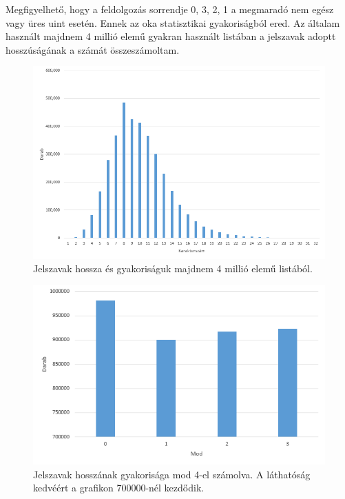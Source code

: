 Megfigyelhető, hogy a feldolgozás sorrendje 0, 3, 2, 1 a megmaradó nem egész vagy üres uint esetén. Ennek az oka statisztikai gyakoriságból ered. Az általam használt majdnem 4 millió elemű gyakran használt listában a jelszavak adoptt hosszúságának a számát összeszámoltam.

\begin{figure}[H]
    \centering
    \includegraphics[width=\textwidth]{images/charts/passwords-by-length.png}
    \caption{Jelszavak hossza és gyakoriságuk majdnem 4 millió elemű listából.}
\end{figure}

\begin{figure}[H]
    \centering
    \includegraphics[width=\textwidth]{images/charts/passwords-by-length-group.png}
    \caption{Jelszavak hosszának gyakorisága mod 4-el számolva. A láthatóság kedvéért a grafikon \num{700000}-nél kezdődik.}
\end{figure}

